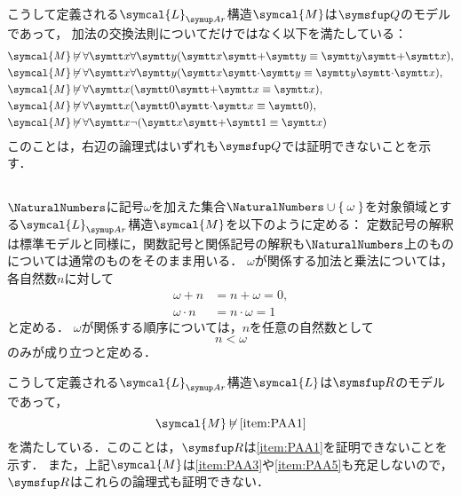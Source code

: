 こうして定義される\(\symcal{L}_{\Ar}\)構造\(\symcal{M}\)は\(\Robinson\)のモデルであって，
加法の交換法則についてだけではなく以下を満たしている：
\begin{align*}
	\symcal{M} & \notsatisfy \forall \obj{x} \forall \obj{y} \paren{\obj{x} \obj{+} \obj{y} \objeq \obj{y} \obj{+} \obj{x}},         \\
	\symcal{M} & \notsatisfy \forall \obj{x} \forall \obj{y} \paren{\obj{x} \obj{\cdot} \obj{y} \objeq \obj{y} \obj{\cdot} \obj{x}}, \\
	\symcal{M} & \notsatisfy \forall \obj{x} \paren{\obj{0} \obj{+} \obj{x} \objeq \obj{x}},                                         \\
	\symcal{M} & \notsatisfy \forall \obj{x} \paren{\obj{0} \obj{\cdot} \obj{x} \objeq \obj{0}},                                     \\
	\symcal{M} & \notsatisfy \forall \obj{x} \lnot \paren{\obj{x} \obj{+} \obj{1} \objeq \obj{x}}
\end{align*}
このことは，右辺の論理式はいずれも\(\Robinson\)では証明できないことを示す．

\subsection*{}

\(\NaturalNumbers\)に記号\(\omega\)を加えた集合\(\NaturalNumbers \cup \Set{\omega}\)を対象領域とする\(\symcal{L}_{\Ar}\)構造\(\symcal{M}\)を以下のように定める：
定数記号の解釈は標準モデルと同様に，関数記号と関係記号の解釈も\(\NaturalNumbers\)上のものについては通常のものをそのまま用いる．
\(\omega\)が関係する加法と乗法については，各自然数\(n\)に対して
\begin{align*}
	\omega + n     & = n + \omega     = 0, \\
	\omega \cdot n & = n \cdot \omega = 1
\end{align*}
と定める．
\(\omega\)が関係する順序については，\(n\)を任意の自然数として
\[
	n < \omega
\]
のみが成り立つと定める．

こうして定義される\(\symcal{L}_{\Ar}\)構造\(\symcal{L}\)は\(\RArithmetic\)のモデルであって，
\[
	\symcal{M} \notsatisfy \text{\cref{item:PAA1}}
\]
を満たしている．このことは，\(\RArithmetic\)は\cref{item:PAA1}を証明できないことを示す．
また，上記\(\symcal{M}\)は\cref{item:PAA3}や\cref{item:PAA5}も充足しないので，
\(\RArithmetic\)はこれらの論理式も証明できない．


\subsection*{}

